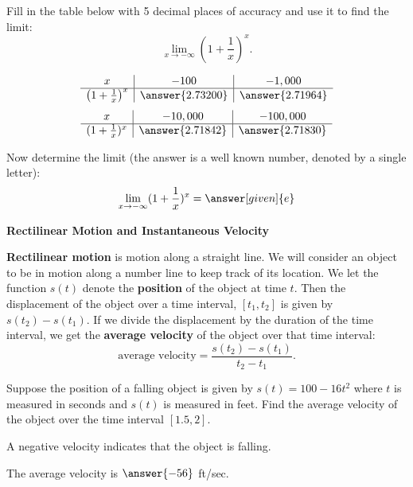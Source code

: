 \documentclass{ximera}
\begin{document}
\begin{problem}[problem 11]
Fill in the table below with 5 decimal places of accuracy and use it to find the limit:
\[\lim_{x \to -\infty} \left(1+\frac{1}{x}\right)^x.\]

\begin{prompt}
\begin{center}
\[
\begin{array}{ c | c | c }
  x & -100 & -1,000   \\ 
	\hline 
	 \left(1+\frac{1}{x}\right)^x & \answer{2.73200} & \answer{2.71964} 
\end{array}
\]
\[
\begin{array}{ c | c | c  }
  x  & -10,000 & -100,000 \\ 
	\hline 
	 (1+\frac{1}{x})^x  & \answer{2.71842} & \answer{2.71830}
\end{array}
\]
\end{center}
Now determine the limit (the answer is a well known number, denoted by a single letter):
\[
\lim_{x \to -\infty} (1+\frac{1}{x})^x = \answer[given]{e}
\]
\end{prompt}
\end{problem}

\begin{center}
{\bf Rectilinear Motion and Instantaneous Velocity}
\end{center}

\textbf{Rectilinear motion} is motion along a straight line. We will consider an object to be in motion along a number line to keep track of its location.
We let the function $s(t)$ denote the \textbf{position} of the object at time $t$. Then the displacement of the object over a time interval,
$[t_1, t_2]$ is given by $s(t_2) - s(t_1)$.  If we divide the displacement by the duration of the time interval, we get the 
\textbf{average velocity} of the object over that time interval:
\[
\text{average velocity} = \frac{s(t_2) - s(t_1)}{t_2 -t_1}.
\]

\begin{problem}[problem 12]
Suppose the position of a falling object is given by $s(t) = 100-16t^2$ where $t$ is measured in seconds and $s(t)$ is measured in feet.
Find the average velocity of the object over the time interval $[1.5, 2]$.\\

\begin{hint}
A negative velocity indicates that the object is falling.
\end{hint}

The average velocity is $\answer{-56}$ ft/sec.
\end{problem}
\end{document}
